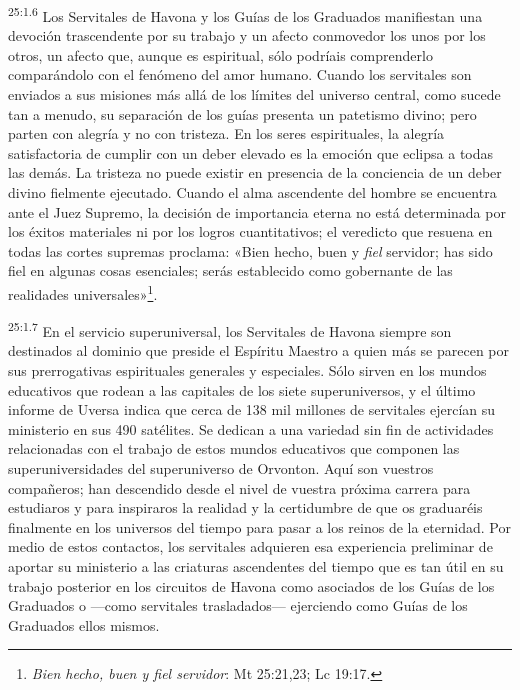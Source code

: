 \par
\textsuperscript{25:1.6} Los Servitales de Havona y los Guías de los Graduados manifiestan una devoción trascendente por su trabajo y un afecto conmovedor los unos por los otros, un afecto que, aunque es espiritual, sólo podríais comprenderlo comparándolo con el fenómeno del amor humano. Cuando los servitales son enviados a sus misiones más allá de los límites del universo central, como sucede tan a menudo, su separación de los guías presenta un patetismo divino; pero parten con alegría y no con tristeza. En los seres espirituales, la alegría satisfactoria de cumplir con un deber elevado es la emoción que eclipsa a todas las demás. La tristeza no puede existir en presencia de la conciencia de un deber divino fielmente ejecutado. Cuando el alma ascendente del hombre se encuentra ante el Juez Supremo, la decisión de importancia eterna no está determinada por los éxitos materiales ni por los logros cuantitativos; el veredicto que resuena en todas las cortes supremas proclama: «Bien hecho, buen y \textit{fiel} servidor; has sido fiel en algunas cosas esenciales; serás establecido como gobernante de las realidades universales»\footnote{\textit{Bien hecho, buen y fiel servidor}: Mt 25:21,23; Lc 19:17.}.

\par
\textsuperscript{25:1.7} En el servicio superuniversal, los Servitales de Havona siempre son destinados al dominio que preside el Espíritu Maestro a quien más se parecen por sus prerrogativas espirituales generales y especiales. Sólo sirven en los mundos educativos que rodean a las capitales de los siete superuniversos, y el último informe de Uversa indica que cerca de 138 mil millones de servitales ejercían su ministerio en sus 490 satélites. Se dedican a una variedad sin fin de actividades relacionadas con el trabajo de estos mundos educativos que componen las superuniversidades del superuniverso de Orvonton. Aquí son vuestros compañeros; han descendido desde el nivel de vuestra próxima carrera para estudiaros y para inspiraros la realidad y la certidumbre de que os graduaréis finalmente en los universos del tiempo para pasar a los reinos de la eternidad. Por medio de estos contactos, los servitales adquieren esa experiencia preliminar de aportar su ministerio a las criaturas ascendentes del tiempo que es tan útil en su trabajo posterior en los circuitos de Havona como asociados de los Guías de los Graduados o ---como servitales trasladados--- ejerciendo como Guías de los Graduados ellos mismos.


